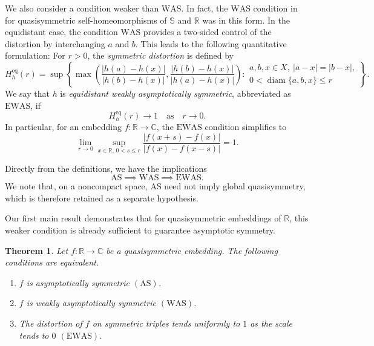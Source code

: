 \documentclass[11pt]{amsart}
\numberwithin{equation}{section}
\newtheorem{theorem}{Theorem}[section]
\theoremstyle{definition} %
\theoremstyle{remarkstyle}
\newcommand{\R}{\mathbb{R}}
\newcommand{\C}{\mathbb{C}}
\newcommand{\diam}{\operatorname{diam}}
\begin{document}
We also consider a condition weaker than $\mathrm{WAS}$. In fact, the $\mathrm{WAS}$ condition in \cite{Car67, GS} for quasisymmetric self-homeomorphisms 
of $\mathbb S$ and $\mathbb R$ was in this form.
In the equidistant case, the condition $\mathrm{WAS}$ provides a two-sided control of the distortion by interchanging $a$ and $b$. 
This leads to the following quantitative formulation:
For $r>0$, the \emph{symmetric distortion} is defined by
\begin{equation*}
 H_h^\mathrm{eq}(r)=\sup\left\{\max\left(\frac{|h(a)-h(x)|}{|h(b)-h(x)|},\frac{|h(b)-h(x)|}{|h(a)-h(x)|}\right):
 \begin{array}{c}
 a,b,x\in X,\ |a-x|=|b-x|,\\
 0<\diam\{a,b,x\}\leq r
 \end{array}
 \right\}.
\end{equation*}
We say that $h$ is \emph{equidistant weakly asymptotically symmetric}, abbreviated as $\mathrm{EWAS}$, if 
\[H_h^\mathrm{eq}(r) \to  1\quad \text{as}\quad r \to 0.\]
In particular, for an embedding $f\colon\R\to\C$,  the $\mathrm{EWAS}$ condition simplifies to
\begin{equation*}
 \lim_{r\to 0}\sup_{x\in\R,\, 0<s\leq r}\frac{|f(x+s)-f(x)|}{|f(x)-f(x-s)|}=1.
\end{equation*}

Directly from the definitions, we have the implications
\[
 \mathrm{AS}\implies\mathrm{WAS}\implies\mathrm{EWAS}.
\]
We note that, on a noncompact space, $\mathrm{AS}$ need not imply global quasisymmetry, which is therefore retained as a separate hypothesis.

Our first main result demonstrates that for quasisymmetric embeddings of $\mathbb{R}$, this weaker condition is already sufficient to guarantee asymptotic symmetry.

\begin{theorem}\label{thm:main-intro}
Let $f\colon\R\to\C$ be a quasisymmetric embedding.  
The following conditions are equivalent.
\begin{enumerate}[label=\textup{(\roman*)}]
\item $f$ is asymptotically symmetric $\mathrm{(AS)}$.
\item $f$ is weakly asymptotically symmetric $\mathrm{(WAS)}$.
\item The distortion of $f$ on symmetric triples tends uniformly to $1$ as the scale tends to $0$ $\mathrm{(EWAS)}$.
\end{enumerate}
\end{theorem}
\end{document}
